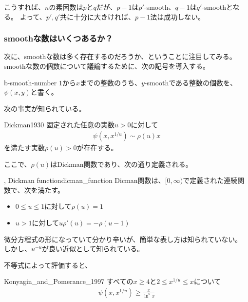 こうすれば、$n$の素因数は$p$と$q$だが、$p-1$は$p'$-smooth、$q-1$は$q'$-smoothとなる。
よって、$p',q'$共に十分に大きければ、$p-1$法は成功しない。

\subsubsection{smoothな数はいくつあるか？}
次に、smoothな数は多く存在するのだろうか、ということに注目してみる。
smoothな数の個数について議論するために、次の記号を導入する。

\begin{Defi}{}{b-smooth-number}
$1$から$x$までの整数のうち、$y$-smoothである整数の個数を、$\psi(x,y)$と書く。
\end{Defi}

次の事実が知られている。

\begin{Theo}{\cite{Dickman1930}}{Dickman1930}
固定された任意の実数$u>0$に対して
\begin{align*}
\psi(x, x^{1/u}) \sim \rho(u) x
\end{align*}
を満たす実数$\rho(u)>0$が存在する。
\end{Theo}

ここで、$\rho(u)$はDickman関数であり、次の通り定義される。

\begin{Defi}{, Dickman function}{dicman_function}
Dicman関数は、$[0,\infty)$で定義された連続関数で、次を満たす。
\begin{itemize}
\item $0\le u \le 1$に対して$\rho(u) = 1$
\item $u > 1$に対して$u\rho'(u) = -\rho(u-1)$
\end{itemize}
\end{Defi}

微分方程式の形になっていて分かり辛いが、簡単な表し方は知られていない。
しかし、$u^{-u}$が良い近似として知られている。


不等式によって評価すると、
\begin{Theo}{\cite{Konyagin2013}}{Konyagin_and_Pomerance_1997}
すべての$x\ge4$と$2 \le x^{1/u}\le x$について
\begin{align*}
\psi(x, x^{1/u}) \ge \frac{x}{\ln^u x}
\end{align*}
\end{Theo}

